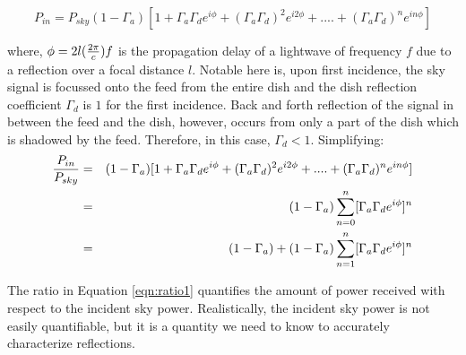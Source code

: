 \documentclass[12pt,preprint]{aastex}
\begin{document}
\begin{equation}\label{eqn:series1}
P_{in} =  P_{sky}(1-\Gamma_{a})[1+ \Gamma_{a}\Gamma_{d} e^{i\phi}+ (\Gamma_{a}\Gamma_{d})^2e^{i2\phi}+ ....+ (\Gamma_{a}\Gamma_{d})^{n}e^{in\phi}]
\end{equation}

where, $\phi = 2l({2\pi \over c})f$ is the propagation delay of a lightwave of frequency $f$ due to a reflection over a focal distance $l$. Notable here is, upon first incidence, the sky signal is focussed onto the feed from the entire dish and the dish reflection coefficient $\Gamma_{d}$ is $1$ for the first incidence. Back and forth reflection of the signal in between the feed and the dish, however, occurs from only a part of the dish which is shadowed by the feed. Therefore, in this case, $\Gamma_{d} < 1$.
Simplifying:
\begin{eqnarray}\label{eqn:ratio1}
{P_{in} \over P_{sky} } & = & (1-\Gamma_{a})[1+ \Gamma_{a}\Gamma_{d} e^{i\phi}+ (\Gamma_{a}\Gamma_{d})^2e^{i2\phi}+ ....+ (\Gamma_{a}\Gamma_{d})^{n}e^{in\phi}] \nonumber\\
      & = & (1-\Gamma_{a}) \displaystyle\sum\limits_{n=0}^{n} [\Gamma_{a}\Gamma_{d}e^{i \phi}]^{n}\nonumber\\
      & = & (1-\Gamma_{a})+(1-\Gamma_{a}) \displaystyle\sum\limits_{n=1}^{n} [\Gamma_{a}\Gamma_{d}e^{i \phi}]^{n}
\end{eqnarray}

The ratio in Equation \ref{eqn:ratio1} quantifies the amount of power received
with respect to the incident sky power. Realistically, the incident sky power
is not easily quantifiable, but it is a quantity we need to know to accurately
characterize reflections.  


 
\end{document}
